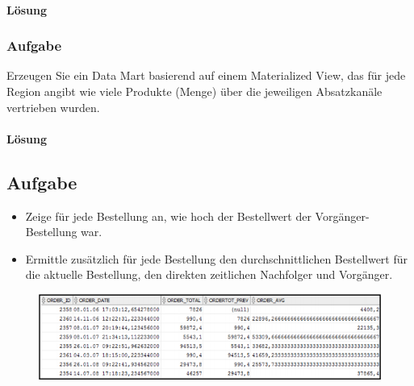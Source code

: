 \paragraph*{Lösung}
\label{subsubsec:uebung_12.aufgabe_04a.loesung}

\subsubsection{Aufgabe}
\label{subsec:uebung_12.aufgabe_04b}
Erzeugen Sie ein Data Mart basierend auf einem Materialized View, das für jede Region angibt
wie viele Produkte (Menge) über die jeweiligen Absatzkanäle vertrieben wurden.

\paragraph*{Lösung}
\label{subsubsec:uebung_12.aufgabe_04b.loesung}


\label{subsec:uebung_12.aufgabe_05}
\subsection{Aufgabe}
\begin{itemize}
  \item Zeige für jede Bestellung an, wie hoch der Bestellwert der Vorgänger-Bestellung war.
  \item Ermittle zusätzlich für jede Bestellung den durchschnittlichen Bestellwert für die aktuelle Bestellung, den direkten zeitlichen Nachfolger und Vorgänger.
\end{itemize}

\begin{figure}[H]
  \centering
  \includegraphics[width=1\textwidth]{img//uebung_12_-_aufgabe_05.png}
  \label{img:uebung_12_-_aufgabe_05}
\end{figure}

